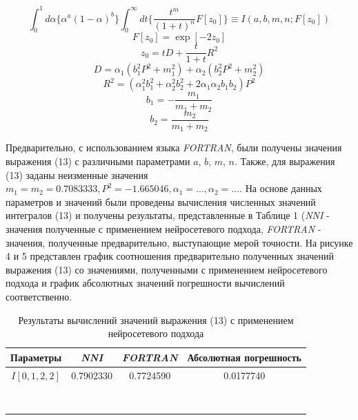 \documentclass[a4paper,12pt]{article} %
\begin{document}
\begin{equation}
    \int_{0}^{1}d\alpha\{\alpha^{a}(1 - \alpha)^b\}\int_{0}^{\infty}dt\{\frac{t^m}{(1+t)^n}F[z_{0}]\} \equiv I(a, b, m, n; F[z_{0}])
\end{equation}
\begin{equation}   
    F[z_0] = \exp[-2z_0]
\end{equation}
\begin{equation} 
    z_0 = tD + \frac{t}{1 + t}R^2
\end{equation}
\begin{equation}     
    D = \alpha_1(b_1^{2}P^2 + m_1^2) + \alpha_2(b_2^{2}P^2 + m_2^2)
\end{equation}
\begin{equation} 
        R^2 = (\alpha_1^{2}b_1^2 + \alpha_2^{2}b_2^2 + 2\alpha_{1}\alpha_{2}b_{1}b_2)P^2
\end{equation}
\begin{equation} 
    b_1 = -\frac{m_1}{m_1 + m_2}
\end{equation}
\begin{equation} 
    b_2 = \frac{m_2}{m_1 + m_2}
\end{equation}

Предварительно, с использованием языка \textit{FORTRAN}, были получены значения выражения (13) с различными параметрами $a$, $b$, $m$, $n$. Также, для  выражения (13) заданы неизменные значения $m_1 = m_2 = 0.7083333, P^2 = -1.665046, \alpha_1 = ..., \alpha_2 = ... $. На основе данных параметров и значений были проведены вычисления численных значений интегралов (13) и получены результаты, представленные в Таблице 1 (\textit{NNI} - значения полученные с применением нейросетевого подхода, \textit{FORTRAN} - значения, полученные предварительно, выступающие мерой точности. На рисунке 4 и 5 представлен график соотношения предварительно полученных значений выражения (13) со значениями, полученными с применением нейросетевого подхода и график абсолютных значений погрешности вычислений соответственно.


\begin{table}
    \centering
    \begin{tabular}{|c|c|c|c|}
        \hline
        Параметры & \textit{NNI} & \textit{FORTRAN} & Абсолютная погрешность \\
        \hline
        $I[0, 1, 2, 2]$ & 0.7902330 & 0.7724590 & 0.0177740 \\
        \hline
         &  &  & \\
         \hline
         &  &  & \\
         \hline
         &  &  & \\
         \hline
         &  &  & \\
         \hline
         &  &  & \\
         \hline
         &  &  & \\
         \hline
         &  &  & \\
         \hline
         &  &  & \\
         \hline
    \end{tabular}
    \caption{Результаты вычислений значений выражения (13) с применением нейросетевого подхода}
    \label{tab:my_label}
\end{table}
\end{document}
